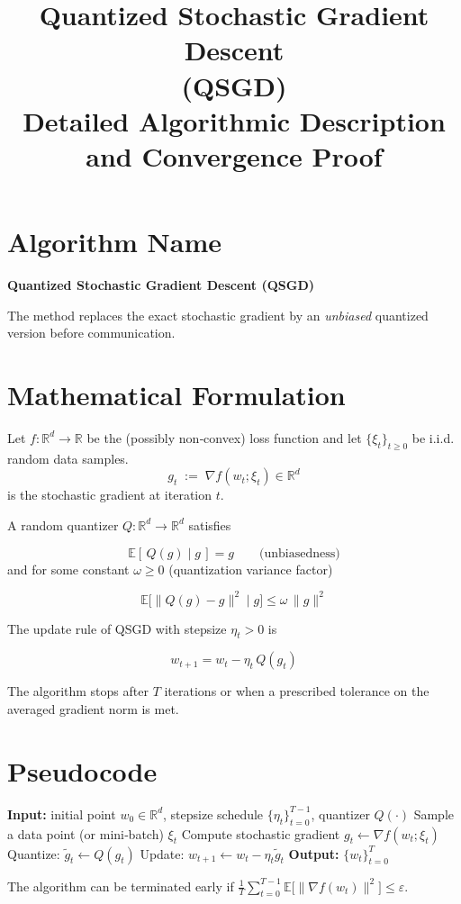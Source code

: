 \documentclass{article}
\newcommand{\EE}{\mathbb{E}}
\newcommand{\RR}{\mathbb{R}}
\begin{document}
\title{Quantized Stochastic Gradient Descent \\ (QSGD) \\ Detailed Algorithmic Description and Convergence Proof}
\author{}
\date{}
\maketitle

\section*{Algorithm Name}
\textbf{Quantized Stochastic Gradient Descent (QSGD)}  

The method replaces the exact stochastic gradient by an \emph{unbiased} quantized version before communication.  

\section*{Mathematical Formulation}
Let $f:\RR^{d}\rightarrow\RR$ be the (possibly non‑convex) loss function and let $\{\xi_t\}_{t\ge 0}$ be i.i.d. random data samples.  
\[
g_t \;:=\; \nabla f(w_t; \xi_t) \in \RR^{d}
\]
is the stochastic gradient at iteration $t$.  

A random quantizer $Q:\RR^{d}\rightarrow\RR^{d}$ satisfies  

\[
\boxed{\EE[\,Q(g)\mid g\,]=g}\qquad\text{(unbiasedness)} \tag{1}
\]
and for some constant $\omega\ge 0$ (quantization variance factor)  

\[
\boxed{\EE\!\big[\|Q(g)-g\|^{2}\mid g\big]\le \omega\,\|g\|^{2}} \tag{2}
\]

The update rule of QSGD with stepsize $\eta_t>0$ is  

\[
\boxed{w_{t+1}=w_t-\eta_t\,Q(g_t)} \tag{3}
\]

The algorithm stops after $T$ iterations or when a prescribed tolerance on the averaged gradient norm is met.  

\section*{Pseudocode}
\begin{algorithm}[H]
\caption{Quantized Stochastic Gradient Descent (QSGD)}
\begin{algorithmic}[1]
\STATE \textbf{Input:} initial point $w_0\in\RR^{d}$, stepsize schedule $\{\eta_t\}_{t=0}^{T-1}$, quantizer $Q(\cdot)$
    \STATE Sample a data point (or mini‑batch) $\xi_t$
    \STATE Compute stochastic gradient $g_t\gets \nabla f(w_t;\xi_t)$
    \STATE Quantize: $\tilde g_t\gets Q(g_t)$
    \STATE Update: $w_{t+1}\gets w_t-\eta_t\tilde g_t$
\ENDFOR
\STATE \textbf{Output:} $\{w_t\}_{t=0}^{T}$
\end{algorithmic}
\end{algorithm}
The algorithm can be terminated early if $\frac{1}{T}\sum_{t=0}^{T-1}\EE\big[\| \nabla f(w_t)\|^{2}\big]\le\varepsilon$.
\end{document}
